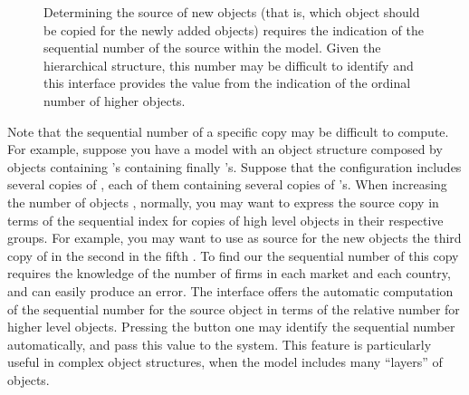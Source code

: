 \documentclass [11pt,a4paper] {book}
\begin{document}
\begin{figure}[ht]
  \centering
  \caption{\small Determining the source of new objects (that is, which object should be copied for the newly added objects) requires the indication of the sequential number of the source within the model. Given the hierarchical structure, this number may be difficult to identify and this interface provides the value from the indication of the ordinal number of higher objects.}
  \label{fig:objnum_compute}
\end{figure}

Note that the sequential number of a specific copy may be difficult to compute. For example, suppose you have a model with an object structure composed by objects  containing 's containing finally 's. Suppose that the configuration includes several copies of , each of them containing several copies of 's. When increasing the number of objects , normally, you may want to express the source copy in terms of the sequential index for copies of high level objects in their respective groups. For example, you may want to use as source for the new objects the third copy of  in the second  in the fifth . To find our the sequential number of this copy requires the knowledge of the number of firms in each market and each country, and can easily produce an error. The interface offers the automatic computation of the sequential number for the source object in terms of the relative number for higher level objects. Pressing the button  one may identify the sequential number automatically, and pass this value to the system. This feature is particularly useful in complex object structures, when the model includes many ``layers'' of objects.
\end{document}
